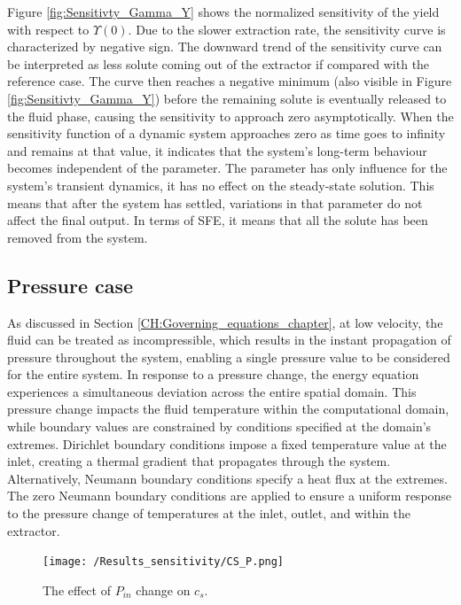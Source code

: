 \documentclass[a4paper,fleqn]{cas-dc}
\begin{document}
	Figure \ref{fig:Sensitivty_Gamma_Y}  shows the normalized sensitivity of the yield with respect to $\Upsilon(0)$. Due to the slower extraction rate, the sensitivity curve is characterized by negative sign. The  downward trend of the sensitivity curve can be interpreted as less solute coming out of the extractor if compared with the reference case. The curve then reaches a negative minimum (also visible in Figure \ref{fig:Sensitivty_Gamma_Y}) before the remaining solute is eventually released to the fluid phase, causing the sensitivity to approach zero asymptotically. When the sensitivity function of a dynamic system approaches zero as time goes to infinity and remains at that value, it indicates that the system's long-term behaviour becomes independent of the parameter. The parameter has only influence for the system's transient dynamics, it has no effect on the steady-state solution. This means that after the system has settled, variations in that parameter do not affect the final output. In terms of SFE, it means that all the solute has been removed from the system.
		
	\subsection{Pressure case}
	As discussed in Section \ref{CH:Governing_equations_chapter}, at low velocity, the fluid can be treated as incompressible, which results in the instant propagation of pressure throughout the system, enabling a single pressure value to be considered for the entire system. In response to a pressure change, the energy equation experiences a simultaneous deviation across the entire spatial domain. This pressure change impacts the fluid temperature within the computational domain, while boundary values are constrained by conditions specified at the domain's extremes. Dirichlet boundary conditions impose a fixed temperature value at the inlet, creating a thermal gradient that propagates through the system. Alternatively,  Neumann boundary conditions specify a heat flux at the extremes. The zero Neumann boundary conditions are applied to ensure a uniform response to the pressure change of temperatures at the inlet, outlet, and within the extractor.
		
	\begin{figure}[!ht]
		\centering
		\texttt{[image: /Results\_sensitivity/CS\_P.png]}
		\caption{The effect of $P_{in}$ change on $c_s$.}
		\label{fig:Sensitivty_P_CS}
	\end{figure}
	
\end{document}

